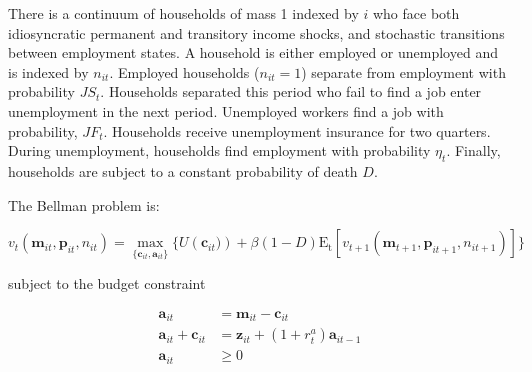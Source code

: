 There is a continuum of households of mass 1 indexed by $i$ who face both idiosyncratic permanent and transitory income shocks, and stochastic transitions between employment states. A household is either employed or unemployed and is indexed by $n_{it}$. Employed households ($n_{it} = 1$) separate from employment with probability $JS_{t}$. Households separated this period who fail to find a job enter unemployment in the next period. Unemployed workers find a job with probability, $JF_{t}$. Households receive unemployment insurance for two quarters. During unemployment, households find employment with probability $\eta_{t} $. Finally, households are subject to a constant probability of death $D$. 





The Bellman problem is:

$$    v_{t}\left(\mathbf{m}_{it} , \mathbf{p}_{it}, n_{it}  \right)  =  \max_{\{\mathbf{c}_{it} , \mathbf{a}_{it}\}} \{U\left(\mathbf{c}_{it})\right)  + \beta (1 - D) \mathrm{E_{t}} \left[ v_{t+1}\left( \mathbf{m}_{t+1}, \mathbf{p}_{it+1}, n_{it+1} \right)\right] \}
$$ 


subject to the budget constraint 

\begin{align*}
\mathbf{a}_{it}     &= \mathbf{m}_{it} - \mathbf{c}_{it}    \\
\mathbf{a}_{it} +\mathbf{c}_{it}    &= \mathbf{z}_{it} +   (1 + r^{a}_{t} ) \mathbf{a}_{it-1} \\ 
\mathbf{a}_{it}  &\geq 0 \\
\end{align*}



